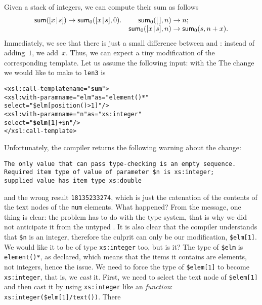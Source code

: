 Given a stack of integers, we can compute their sum as follows
\begin{equation*}
\begin{array}{@{}r@{\;}l@{\;}lr@{\;}l@{\;}l@{}}
\fun{sum}(\cons{x}{s}) & \rightarrow & \fun{sum}_0(\cons{x}{s},0). &
\fun{sum}_0(\el,n) & \rightarrow & n;\\
&&& \fun{sum}_0(\cons{x}{s},n) & \rightarrow & \fun{sum}_0(s,n+x).
\end{array}
\end{equation*}
Immediately, we see that there is just a small difference between
 and : instead of adding~\(1\), we
add~\(x\). Thus, we can expect a tiny modification of the
corresponding \XSLT template. Let us assume the following input:
\noindent with the \DTD
{}
\noindent The change we would like to make to \texttt{len3} is
\begin{alltt}
        <xsl:call-template name="\textbf{sum}">
          <xsl:with-param name="elm" as="element()*"
                          select="\$elm[position()>1]"/>
          <xsl:with-param name="n" as="xs:integer"
                          select="\textbf{\$elm[1]} + \$n"/>
        </xsl:call-template>
\end{alltt}
Unfortunately, the compiler \Saxon returns the following warning about
the change:
\begin{verbatim}
The only value that can pass type-checking is an empty sequence.
Required item type of value of parameter $n is xs:integer;
supplied value has item type xs:double
\end{verbatim}
and the wrong result \texttt{18135233274}, which is just the
catenation of the contents of the text nodes of the \texttt{num}
elements. What happened? From the message, one thing is clear: the
problem has to do with the type system, that is why we did not
anticipate it from the untyped . It is also clear
that the compiler understands that \texttt{\$n} is an integer,
therefore the culprit can only be our modification,
\texttt{\$elm[1]}. We would like it to be of type \texttt{xs:integer}
too, but is it? The type of \texttt{\$elm} is \texttt{element()*}, as
declared, which means that the items it contains are elements, not
integers, hence the issue. We need to force the type of
\texttt{\$elem[1]} to become \texttt{xs:integer}, that is, we
\emph{cast} it. First, we need to select the text node of
\texttt{\$elem[1]} and then cast it by using \texttt{xs:integer} like
an \XPath \emph{function}: \texttt{xs:integer(\$elm[1]/text())}. There
